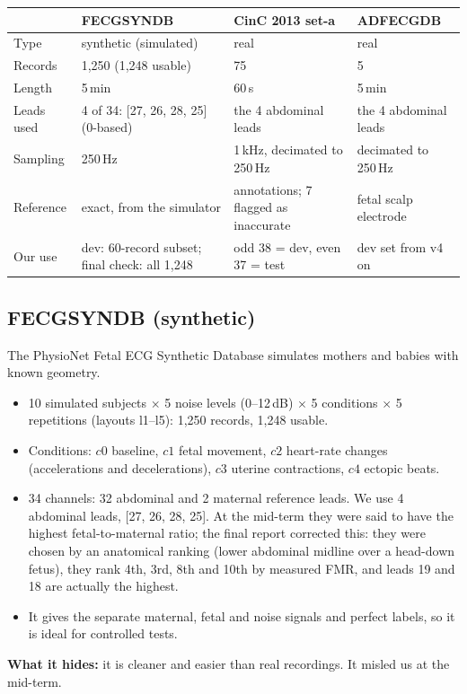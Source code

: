 \documentclass[11pt]{article}
\begin{document}
\begin{center}
\small
\begin{tabularx}{\linewidth}{@{}l X X X@{}}
\toprule
 & \textbf{FECGSYNDB} & \textbf{CinC 2013 set-a} & \textbf{ADFECGDB} \\
\midrule
Type & synthetic (simulated) & real & real \\
Records & 1,250 (1,248 usable) & 75 & 5 \\
Length & 5\,min & 60\,s & 5\,min \\
Leads used & 4 of 34: [27, 26, 28, 25] (0-based) & the 4 abdominal leads & the 4 abdominal leads \\
Sampling & 250\,Hz & 1\,kHz, decimated to 250\,Hz & decimated to 250\,Hz \\
Reference & exact, from the simulator & annotations; 7 flagged as inaccurate & fetal scalp electrode \\
Our use & dev: 60-record subset; final check: all 1,248 & odd 38 = dev, even 37 = test & dev set from v4 on \\
\bottomrule
\end{tabularx}
\end{center}

\subsection{FECGSYNDB (synthetic)}
The PhysioNet Fetal ECG Synthetic Database simulates mothers and babies with known geometry.
\begin{itemize}
  \item 10 simulated subjects $\times$ 5 noise levels (0--12\,dB) $\times$ 5 conditions $\times$ 5 repetitions (layouts l1--l5): 1,250 records, 1,248 usable.
  \item Conditions: $c0$ baseline, $c1$ fetal movement, $c2$ heart-rate changes (accelerations and decelerations), $c3$ uterine contractions, $c4$ ectopic beats.
  \item 34 channels: 32 abdominal and 2 maternal reference leads. We use 4 abdominal leads, [27, 26, 28, 25]. At the mid-term they were said to have the highest fetal-to-maternal ratio; the final report corrected this: they were chosen by an anatomical ranking (lower abdominal midline over a head-down fetus), they rank 4th, 3rd, 8th and 10th by measured FMR, and leads 19 and 18 are actually the highest.
  \item It gives the separate maternal, fetal and noise signals and perfect labels, so it is ideal for controlled tests.
\end{itemize}
\textbf{What it hides:} it is cleaner and easier than real recordings. It misled us at the mid-term.
\end{document}
